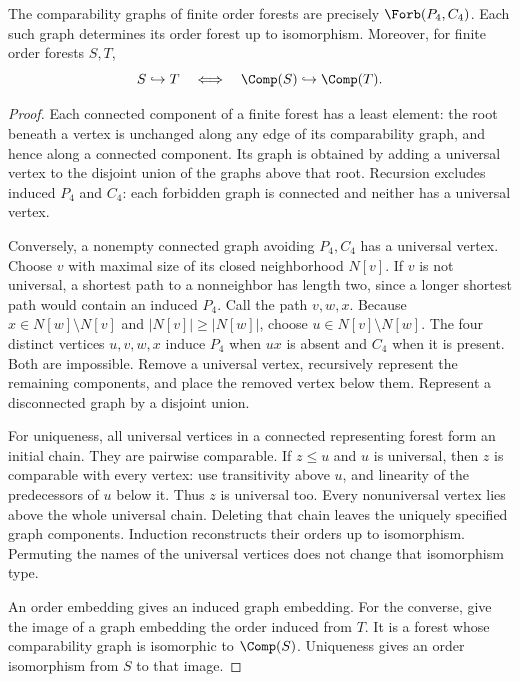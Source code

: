 \documentclass[11pt]{article}
\begin{document}
\begin{lemma}\label{lem:bridge}
The comparability graphs of finite order forests are precisely
$\Forb(P_4,C_4)$. Each such graph determines its order forest up to
isomorphism. Moreover, for finite order forests $S,T$,
\[
 S\hookrightarrow T\quad\Longleftrightarrow\quad
 \Comp(S)\hookrightarrow\Comp(T).
\]
\end{lemma}
\begin{proof}
Each connected component of a finite forest has a least element: the
root beneath a vertex is unchanged along any edge of its comparability
graph, and hence along a connected component. Its graph is obtained by
adding a universal vertex to the disjoint union of the graphs above
that root. Recursion excludes induced $P_4$ and $C_4$: each forbidden
graph is connected and neither has a universal vertex.

Conversely, a nonempty connected graph avoiding $P_4,C_4$ has a universal
vertex. Choose $v$ with maximal size of its closed neighborhood $N[v]$.
If $v$ is not universal, a shortest path to a nonneighbor has length
two, since a longer shortest path would contain an induced $P_4$.
Call the path $v,w,x$. Because $x\in N[w]\setminus N[v]$ and
$|N[v]|\geq|N[w]|$, choose $u\in N[v]\setminus N[w]$. The four distinct
vertices $u,v,w,x$ induce $P_4$ when $ux$ is absent and $C_4$ when it is
present. Both are impossible. Remove a universal vertex, recursively
represent the remaining components, and place the removed vertex below
them. Represent a disconnected graph by a disjoint union.

For uniqueness, all universal vertices in a connected representing
forest form an initial chain. They are pairwise comparable. If $z\leq u$
and $u$ is universal, then $z$ is comparable with every vertex: use
transitivity above $u$, and linearity of the predecessors of $u$ below
it. Thus $z$ is universal too. Every nonuniversal vertex lies above the
whole universal chain. Deleting that chain leaves the uniquely specified
graph components. Induction reconstructs their orders up to isomorphism.
Permuting the names of the universal vertices does not change that
isomorphism type.

An order embedding gives an induced graph embedding. For the converse,
give the image of a graph embedding the order induced from $T$. It is
a forest whose comparability graph is isomorphic to $\Comp(S)$.
Uniqueness gives an order isomorphism from $S$ to that image.
\end{proof}
\end{document}
